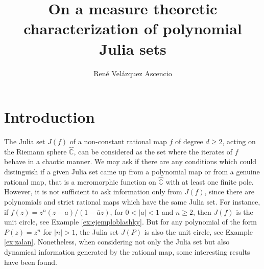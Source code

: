 \documentclass[12pt,letterpaper,twoside]{book}
\author{René Velázquez Ascencio}
\title{On a measure theoretic characterization of polynomial Julia sets}
\newcommand{\C}{\widehat{\mathbb{C}}}
\theoremstyle{definition}
\begin{document}
\maketitle


\chapter*{Introduction}

The Julia set $J(f)$ of a non-constant rational map $f$ of degree $d\geq 2$, acting on the Riemann sphere $\C$, can be considered as the set where the iterates of $f$ behave in a chaotic manner. We may ask if there are any conditions which could distinguish if a given Julia set came up from a polynomial map or from a genuine rational map, that is a meromorphic function on $\C$ with at least one finite pole. However, it is not sufficient to ask information only from $J(f)$, since there are polynomials and strict rational maps which have the same Julia set. For instance, if $f(z)=z^n(z-a)/(1-\overline{a}z)$, for $0<|a|<1$ and $n\geq 2$, then $J(f)$ is the unit circle, see Example \ref{ex:ejemploblashky}. But for any polynomial of the form $P(z)=z^n$ for $|n|>1$, the Julia set $J(P)$ is also the unit circle, see Example \ref{ex:zalan}. Nonetheless, when considering not only the Julia set but also dynamical information generated by the rational map, some interesting results have been found.\\
\end{document}
